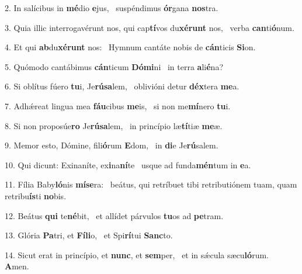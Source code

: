 2. In salícibus in \textbf{mé}dio \textbf{e}jus, \ast\  suspéndimus \textbf{ór}gana \textbf{nos}tra.\

3. Quia illic interrogavérunt nos, qui cap\textbf{tí}vos du\textbf{xé}\textbf{runt} nos, \ast\  verba \textbf{can}ti\textbf{ó}num.\

4. Et qui \textbf{ab}du\textbf{xé}\textbf{runt} nos: \ast\  Hymnum cantáte nobis de \textbf{cán}ticis \textbf{Si}on.\

5. Quómodo cantábimus \textbf{cán}ticum \textbf{Dó}\textbf{mi}ni \ast\  in terra \textbf{a}li\textbf{é}na?\

6. Si oblítus fúero \textbf{tu}i, Je\textbf{rú}\textbf{sa}lem, \ast\  oblivióni detur \textbf{déx}tera \textbf{me}a.\

7. Adhǽreat lingua mea \textbf{fáu}cibus \textbf{me}is, \ast\  si non me\textbf{mí}nero \textbf{tu}i.\

8. Si non proposúe\textbf{ro} Je\textbf{rú}\textbf{sa}lem, \ast\  in princípio læ\textbf{tí}tiæ \textbf{me}æ.\

9. Memor esto, Dómine, fili\textbf{ó}rum \textbf{E}dom, \ast\  in \textbf{di}e Je\textbf{rú}salem.\

10. Qui dicunt: Exinaníte, ex\textbf{i}na\textbf{ní}te \ast\  usque ad funda\textbf{mén}tum in \textbf{e}a.\

11. Fília Baby\textbf{ló}nis \textbf{mí}\textbf{se}ra: \ast\  beátus, qui retríbuet tibi retributiónem tuam, quam retribu\textbf{ís}ti \textbf{no}bis.\

12. Beátus \textbf{qui} te\textbf{né}bit, \ast\  et allídet párvulos \textbf{tu}os ad \textbf{pe}tram.\

13. Glória \textbf{Pa}tri, et \textbf{Fí}\textbf{li}o, \ast\  et Spi\textbf{rí}tui \textbf{Sanc}to.\

14. Sicut erat in princípio, et \textbf{nunc}, et \textbf{sem}per, \ast\  et in sǽcula sæcu\textbf{ló}rum. \textbf{A}men.\

